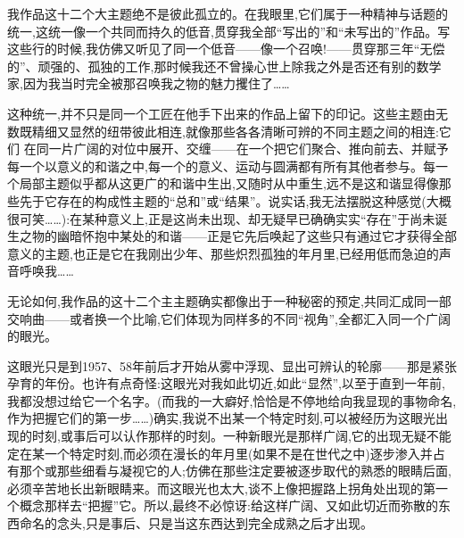 我作品这十二个大主题绝不是彼此孤立的。在我眼里,它们属于一种精神与话题的统一,这统一像一个共同而持久的低音,贯穿我全部“写出的”和“未写出的”作品。写这些行的时候,我仿佛又听见了同一个低音——像一个召唤!——贯穿那三年“无偿的”、顽强的、孤独的工作,那时候我还不曾操心世上除我之外是否还有别的数学家,因为我当时完全被那召唤我之物的魅力攫住了……

这种统一,并不只是同一个工匠在他手下出来的作品上留下的印记。这些主题由无数既精细又显然的纽带彼此相连,就像那些各各清晰可辨的不同主题之间的相连:它们
在同一片广阔的对位中展开、交缠——在一个把它们聚合、推向前去、并赋予每一个以意义的和谐之中,每一个的意义、运动与圆满都有所有其他者参与。每一个局部主题似乎都从这更广的和谐中生出,又随时从中重生,远不是这和谐显得像那些先于它存在的构成性主题的“总和”或“结果”。说实话,我无法摆脱这种感觉(大概很可笑……):在某种意义上,正是这尚未出现、却无疑早已确确实实“存在”于尚未诞生之物的幽暗怀抱中某处的和谐——正是它先后唤起了这些只有通过它才获得全部意义的主题,也正是它在我刚出少年、那些炽烈孤独的年月里,已经用低而急迫的声音呼唤我……

无论如何,我作品的这十二个主主题确实都像出于一种秘密的预定,共同汇成同一部交响曲——或者换一个比喻,它们体现为同样多的不同“视角”,全都汇入同一个广阔的眼光。

这眼光只是到1957、58年前后才开始从雾中浮现、显出可辨认的轮廓——那是紧张孕育的年份。也许有点奇怪:这眼光对我如此切近,如此“显然”,以至于直到一年前,我都没想过给它一个名字。(而我的一大癖好,恰恰是不停地给向我显现的事物命名,作为把握它们的第一步……)确实,我说不出某一个特定时刻,可以被经历为这眼光出现的时刻,或事后可以认作那样的时刻。一种新眼光是那样广阔,它的出现无疑不能定在某一个特定时刻,而必须在漫长的年月里(如果不是在世代之中)逐步渗入并占有那个或那些细看与凝视它的人;仿佛在那些注定要被逐步取代的熟悉的眼睛后面,必须辛苦地长出新眼睛来。而这眼光也太大,谈不上像把握路上拐角处出现的第一个概念那样去“把握”它。所以,最终不必惊讶:给这样广阔、又如此切近而弥散的东西命名的念头,只是事后、只是当这东西达到完全成熟之后才出现。

